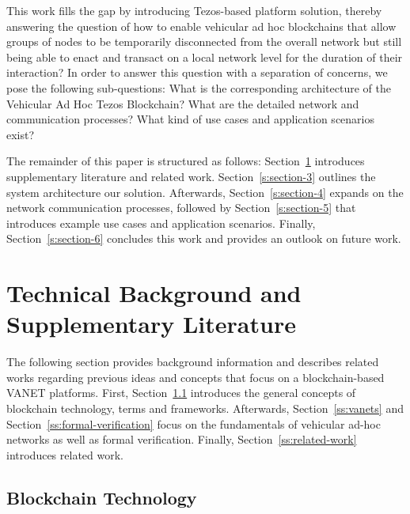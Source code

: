 \documentclass{llncs}
\begin{document}
{%
		
		This work fills the gap by introducing Tezos-based platform solution, thereby answering the question of how to enable vehicular ad hoc blockchains that allow groups of nodes to be temporarily disconnected from the overall network but still being able to enact and transact on a local network level for the duration of their interaction? In order to answer this question with a separation of concerns, we pose the following sub-questions: What is the corresponding architecture of the Vehicular Ad Hoc Tezos Blockchain? What are the detailed network and communication processes? What kind of use cases and application scenarios exist?
		
		The remainder of this paper is structured as follows: Section~\ref{s:section-2} introduces supplementary literature and related work. Section~\ref{s:section-3} outlines the system architecture our solution. Afterwards, Section~\ref{s:section-4} expands on the network communication processes, followed by Section~\ref{s:section-5} that introduces example use cases and application scenarios. Finally, Section~\ref{s:section-6} concludes this work and provides an outlook on future work.



	\section{Technical Background and Supplementary Literature}	
		\label{s:section-2}
		
		The following section provides background information and describes related works regarding previous ideas and concepts that focus on a blockchain-based VANET platforms. First, Section~\ref{ss:blockchain-intro} introduces the general concepts of blockchain technology, terms and frameworks. Afterwards, Section~\ref{ss:vanets} and Section~\ref{ss:formal-verification} focus on the fundamentals of vehicular ad-hoc networks as well as formal verification. Finally, Section~\ref{ss:related-work} introduces related work. 
					
		
		\subsection{Blockchain Technology}
			\label{ss:blockchain-intro}
			
}
\end{document}
